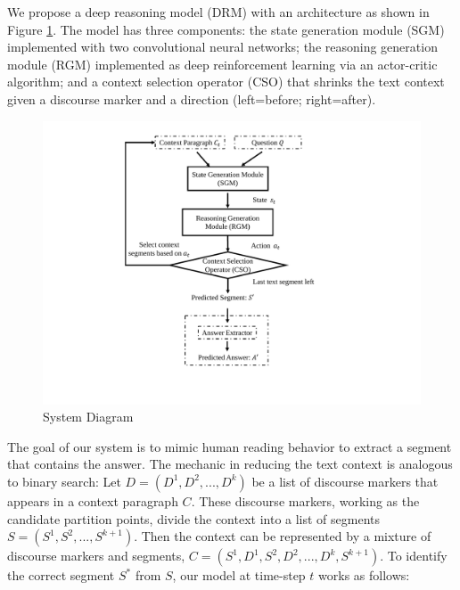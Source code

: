 We propose a deep reasoning model (DRM) with an architecture as shown in Figure \ref{fig:systemDiagram}. The model has three components: the state generation module (SGM) implemented with two convolutional neural networks; the reasoning generation module (RGM) implemented as deep reinforcement learning via an actor-critic algorithm; and a context selection operator (CSO) that shrinks the text context given a discourse marker and a direction (left=before; right=after).


\begin{figure}
\centering
\begin{minipage}{.45\textwidth}
 \centering
 \includegraphics[width=0.9\linewidth]{Images/fig1.pdf}
 \caption{System Diagram}
 \label{fig:systemDiagram}
\end{minipage}
\end{figure}
\label{sec2description}
The goal of our system is to mimic human reading behavior to extract a segment that
contains the answer. The mechanic in reducing the text context is analogous to binary search: Let $D=(D^1,D^2,...,D^k)$ be a list of discourse markers that appears in a context paragraph $C$. These discourse markers, working as the candidate partition points, divide the context into a list of segments $S=(S^1,S^2,...,S^{k+1})$. Then the context can be represented by a mixture of discourse markers and segments, $C=(S^1, D^1, S^2, D^2,...,D^k, S^{k+1})$. To identify the correct segment $S^*$ from $S$, our model at time-step $t$ works as follows:\\
